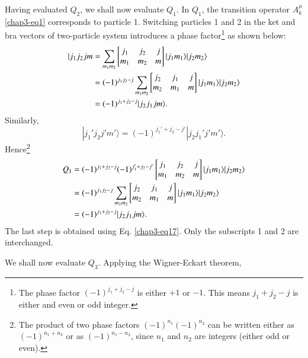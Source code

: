 Having evaluated $Q_2$, we shall now evaluate $Q_1$. In $Q_1$, the transition operator $A_k^\mu$ \eqref{chap3-eq1} corresponds to particle 1. Switching particles 1 and 2 in the ket and bra vectors of two-particle system introduces a phase factor\footnote{The phase factor $(-1)^{j_1 +j_2-j}$ is either $+1$ or $-1$. This means $j_1 + j_2-j$ is either and even or odd integer.}  as shown below:
\begin{align}
| j_1 j_2 j m 
& = \sum_{m_1m_2} \begin{bmatrix}j_1 & j_2 & j\\m_1 & m_2 & m\end{bmatrix} |j_1 m_1 \rangle| j_2 m_2\rangle \notag \\
& = (-1)^{j_1 j_2-j} \sum_{m_1 m_2} 
	\begin{bmatrix}j_2 & j_1 & j\\m_2 & m_1 & m \end{bmatrix} |j_1 m_1 \rangle | j_2 m_2 \rangle \notag \\
& = (-1)^{j_1 + j_2-j} | j_2 j_1 j m \rangle .\label{chap3-eq19}
\end{align}
Similarly,
\begin{equation}
|j_1' j_2 j' m' \rangle = (-1)^{j_1' + j_2 - j'} | j_2 j_1' j' m' \rangle . \label{chap3-eq20}
\end{equation}
Hence\footnote{The product of two phase factors $(-1)^{n_1} (-1)^{n_2}$ can be written either as $(-1)^{n_1 + n_2}$ or as $(-1)^{n_1-n_2}$, since $n_1$ and $n_2$ are integers (either odd or even).}
\begin{align}
Q_1 & = (-1)^{j_1 + j_2 -j} (-1)^{j_1' + j_2 -j' }
	\begin{bmatrix}j_1 & j_2 & j\\m_1 & m_2 & m\end{bmatrix} | j_1 m_1 \rangle | j_2 m_2 \rangle \notag \\
& = (-1)^{j_1 j_2-j} \sum_{m_1 m_2}
\begin{bmatrix}j_2 & j_1 & j\\m_2 & m_1 & m\end{bmatrix} | j_1 m_1 \rangle | j_2 m_2 \rangle \notag \\
& = (-1)^{j_1+j_2-j} | j_2 j_1 jm \rangle. \label{chap3-eq21}
\end{align}
The last step is obtained using Eq. \eqref{chap3-eq17}. Only the subscripts 1 and 2 are interchanged. 

We shall now evaluate $Q_3$. Applying the Wigner-Eckart theorem,

